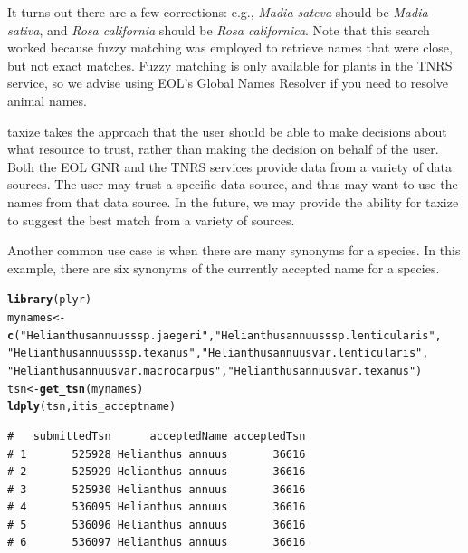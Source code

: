 \documentclass[10pt,a4paper,twocolumn]{article}\usepackage[]{graphicx}\usepackage[]{color}
\makeatletter
\newcommand{\hlstr}[1]{\textcolor[rgb]{0.192,0.494,0.8}{#1}}%
\newcommand{\hlstd}[1]{\textcolor[rgb]{0.345,0.345,0.345}{#1}}%
\newcommand{\hlkwb}[1]{\textcolor[rgb]{0.69,0.353,0.396}{#1}}%
\newcommand{\hlkwd}[1]{\textcolor[rgb]{0.737,0.353,0.396}{\textbf{#1}}}%
\newenvironment{kframe}{%
 \def\at@end@of@kframe{}%
 \ifinner\ifhmode%
  \def\at@end@of@kframe{\end{minipage}}%
  \begin{minipage}{\columnwidth}%
 \fi\fi%
 \def\FrameCommand##1{\hskip\@totalleftmargin \hskip-\fboxsep
 \colorbox{shadecolor}{##1}\hskip-\fboxsep
     \hskip-\linewidth \hskip-\@totalleftmargin \hskip\columnwidth}%
 \MakeFramed {\advance\hsize-\width
   \@totalleftmargin\z@ \linewidth\hsize
   \@setminipage}}%
 {\par\unskip\endMakeFramed%
 \at@end@of@kframe}
\newenvironment{knitrout}{}{} %
\makeatother
\begin{document}
It turns out there are a few corrections: e.g., \emph{Madia sateva} should be \emph{Madia sativa}, and \emph{Rosa california} should be \emph{Rosa californica}. Note that this search worked because fuzzy matching was employed to retrieve names that were close, but not exact matches. Fuzzy matching is only available for plants in the TNRS service, so we advise using EOL's Global Names Resolver if you need to resolve animal names.

taxize takes the approach that the user should be able to make decisions about what resource to trust, rather than making the decision on behalf of the user. Both the EOL GNR and the TNRS services provide data from a variety of data sources. The user may trust a specific data source, and thus may want to use the names from that data source. In the future, we may provide the ability for taxize to suggest the best match from a variety of sources.

Another common use case is when there are many synonyms for a species. In this example, there are six synonyms of the currently accepted name for a species. 

\begin{knitrout}\scriptsize
{}\color{fgcolor}\begin{kframe}
\begin{alltt}
\hlkwd{library}\hlstd{(plyr)}
\hlstd{mynames} \hlkwb{<-} \hlkwd{c}\hlstd{(}\hlstr{"Helianthus annuus ssp. jaegeri"}\hlstd{,} \hlstr{"Helianthus annuus ssp. lenticularis"}\hlstd{,}
    \hlstr{"Helianthus annuus ssp. texanus"}\hlstd{,} \hlstr{"Helianthus annuus var. lenticularis"}\hlstd{,}
    \hlstr{"Helianthus annuus var. macrocarpus"}\hlstd{,} \hlstr{"Helianthus annuus var. texanus"}\hlstd{)}
\hlstd{tsn} \hlkwb{<-} \hlkwd{get_tsn}\hlstd{(mynames)}
\hlkwd{ldply}\hlstd{(tsn, itis_acceptname)}
\end{alltt}
\begin{verbatim}
#   submittedTsn      acceptedName acceptedTsn
# 1       525928 Helianthus annuus       36616
# 2       525929 Helianthus annuus       36616
# 3       525930 Helianthus annuus       36616
# 4       536095 Helianthus annuus       36616
# 5       536096 Helianthus annuus       36616
# 6       536097 Helianthus annuus       36616
\end{verbatim}
\end{kframe}
\end{knitrout}
\end{document}
